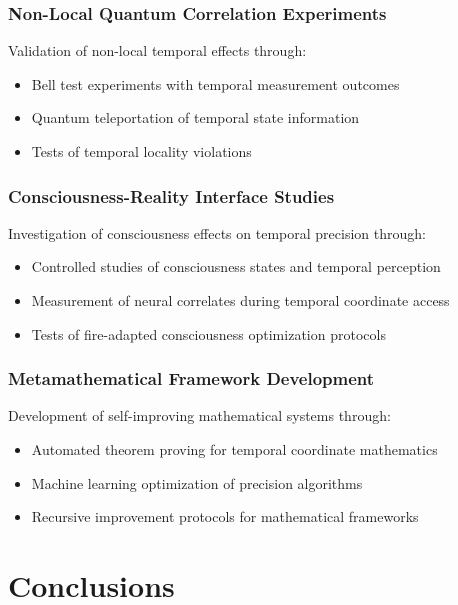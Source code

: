 \documentclass[12pt,a4paper]{article}
\begin{document}
{\subsubsection{Non-Local Quantum Correlation Experiments}

Validation of non-local temporal effects through:

\begin{itemize}
\item Bell test experiments with temporal measurement outcomes
\item Quantum teleportation of temporal state information
\item Tests of temporal locality violations
\end{itemize}

\subsubsection{Consciousness-Reality Interface Studies}

Investigation of consciousness effects on temporal precision through:

\begin{itemize}
\item Controlled studies of consciousness states and temporal perception
\item Measurement of neural correlates during temporal coordinate access
\item Tests of fire-adapted consciousness optimization protocols
\end{itemize}

\subsubsection{Metamathematical Framework Development}

Development of self-improving mathematical systems through:

\begin{itemize}
\item Automated theorem proving for temporal coordinate mathematics
\item Machine learning optimization of precision algorithms
\item Recursive improvement protocols for mathematical frameworks
\end{itemize}

\section{Conclusions}

}
\end{document}
